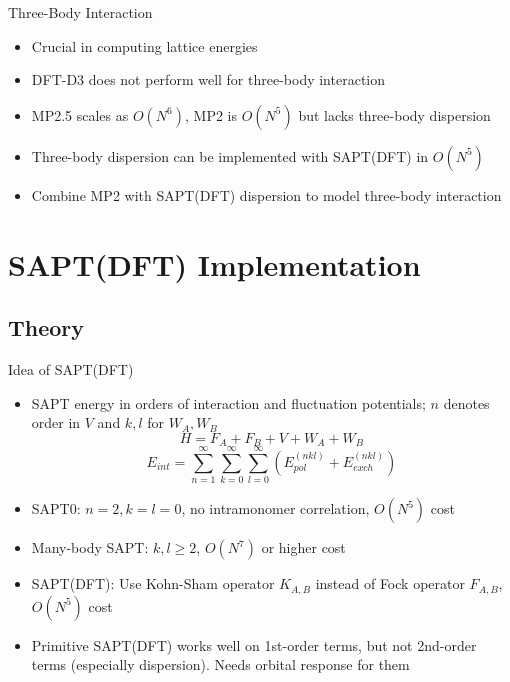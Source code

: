 \documentclass{beamer}
\begin{document}
    \begin{frame}{Three-Body Interaction}
        \begin{itemize}
            \item Crucial in computing lattice energies
            \item DFT-D3 does not perform well for three-body interaction
            \item MP2.5 scales as $O(N^6)$, MP2 is $O(N^5)$ but lacks three-body dispersion
            \item Three-body dispersion can be implemented with SAPT(DFT) in $O(N^5)$
            \item Combine MP2 with SAPT(DFT) dispersion to model three-body interaction  
        \end{itemize}   
    \end{frame}

\section{SAPT(DFT) Implementation}
    
    \subsection{Theory}
             
        \begin{frame}{Idea of SAPT(DFT)}
            \begin{itemize}
                \item SAPT energy in orders of interaction and fluctuation potentials; $n$ denotes order in $V$ and $k,l$ for $W_A, W_B$
                $$H = F_A + F_B + V + W_A + W_B$$
                $$E_{int} = \sum_{n=1}^\infty \sum_{k=0}^\infty \sum_{l=0}^\infty \left(E_{pol}^{(nkl)} + E_{exch}^{(nkl)}\right)$$
                \item SAPT0: $n = 2, k = l = 0$, no intramonomer correlation, $O(N^5)$ cost
                \item Many-body SAPT: $k,l \geq 2$, $O(N^7)$ or higher cost
                \item SAPT(DFT): Use Kohn-Sham operator $K_{A,B}$ instead of Fock operator $F_{A,B}$, $O(N^5)$ cost
                \item Primitive SAPT(DFT) works well on 1st-order terms, but not 2nd-order terms (especially dispersion). Needs orbital response for them
            \end{itemize}
        \end{frame}
\end{document}
